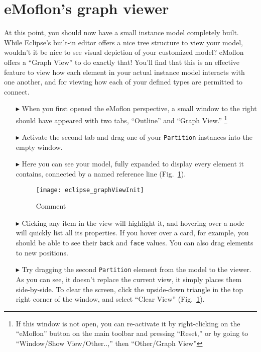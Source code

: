 \newpage
\section{eMoflon's graph viewer}
\genHeader
\hypertarget{sec:Graph View}{}

At this point, you should now have a small instance model completely built. While Eclipse's built-in editor offers a nice tree structure to view your model,
wouldn't it be nice to see visual depiction of your customized model? eMoflon offers a ``Graph View'' to do exactly that! You'll find that this is an effective
feature to view how each element in your actual instance model interacts with one another, and for viewing how each of your defined types are permitted to connect.

\begin{itemize}

\item[$\blacktriangleright$] When you first opened the eMoflon perspective, a small window to the right should have appeared with two tabs, ``Outline'' and
``Graph View.'' \footnote{If this window is not open, you can re-activate it by right-clicking on the ``eMoflon'' button on the main toolbar and pressing
``Reset,'' or by going to ``Window/Show View/Other..,'' then ``Other/Graph View''} 

\item[$\blacktriangleright$] Activate the second tab and drag one of your \texttt{Partition} instances into the empty window. 

\item[$\blacktriangleright$] Here you can see your model, fully expanded to display every element it contains, connected by a named reference line
(Fig.~\ref{fig:graphView_init}).

\begin{figure}[htbp]
	\centering
  \texttt{[image: eclipse\_graphViewInit]}
	\caption{Comment}
	\label{fig:graphView_init}
\end{figure}

\item[$\blacktriangleright$] Clicking any item in the view will highlight it, and hovering over a node will quickly list all its properties. If you hover
over a card, for example, you should be able to see their \texttt{back} and \texttt{face} values. You can also drag elements to new positions.

\clearpage

\item[$\blacktriangleright$] Try dragging the second \texttt{Partition} element from the model to the viewer. As you can see, it doesn't replace the current
view, it simply places them side-by-side. To clear the screen, click the upside-down triangle in the top right corner of the window, and select ``Clear View''
(Fig.~\ref{fig:graphView_init}).


\end{itemize}
